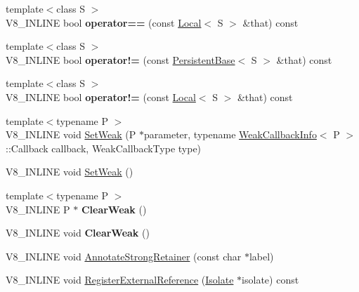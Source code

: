 \begin{DoxyCompactItemize}
{\footnotesize template$<$class S $>$ }\\V8\+\_\+\+I\+N\+L\+I\+NE bool {\bfseries operator==} (const \mbox{\hyperlink{classv8_1_1Local}{Local}}$<$ S $>$ \&that) const
\item 
\mbox{\label{classv8_1_1PersistentBase_a2893d38e56559c016e33e832b814a515}} 
{\footnotesize template$<$class S $>$ }\\V8\+\_\+\+I\+N\+L\+I\+NE bool {\bfseries operator!=} (const \mbox{\hyperlink{classv8_1_1PersistentBase}{Persistent\+Base}}$<$ S $>$ \&that) const
\item 
\mbox{\label{classv8_1_1PersistentBase_a6bfcb31182bcc9a2cc20b83807f7fb45}} 
{\footnotesize template$<$class S $>$ }\\V8\+\_\+\+I\+N\+L\+I\+NE bool {\bfseries operator!=} (const \mbox{\hyperlink{classv8_1_1Local}{Local}}$<$ S $>$ \&that) const
\item 
{\footnotesize template$<$typename P $>$ }\\V8\+\_\+\+I\+N\+L\+I\+NE void \mbox{\hyperlink{classv8_1_1PersistentBase_aebb8a2c97e219102f613ff3749c956f6}{Set\+Weak}} (P $\ast$parameter, typename \mbox{\hyperlink{classv8_1_1WeakCallbackInfo}{Weak\+Callback\+Info}}$<$ P $>$\+::Callback callback, Weak\+Callback\+Type type)
\item 
V8\+\_\+\+I\+N\+L\+I\+NE void \mbox{\hyperlink{classv8_1_1PersistentBase_a09fd1d1c3cd3ff32b91937f4d8beb1ea}{Set\+Weak}} ()
\item 
\mbox{\label{classv8_1_1PersistentBase_a444d27c00650e3663348024df08cb121}} 
{\footnotesize template$<$typename P $>$ }\\V8\+\_\+\+I\+N\+L\+I\+NE P $\ast$ {\bfseries Clear\+Weak} ()
\item 
\mbox{\label{classv8_1_1PersistentBase_afe515daead108cceb1699b54051df13b}} 
V8\+\_\+\+I\+N\+L\+I\+NE void {\bfseries Clear\+Weak} ()
\item 
V8\+\_\+\+I\+N\+L\+I\+NE void \mbox{\hyperlink{classv8_1_1PersistentBase_a27ddb6118b13225207e9641c1e6c8c91}{Annotate\+Strong\+Retainer}} (const char $\ast$label)
\item 
V8\+\_\+\+I\+N\+L\+I\+NE void \mbox{\hyperlink{classv8_1_1PersistentBase_a427ad28478a6a208605fca3d39ce4bdf}{Register\+External\+Reference}} (\mbox{\hyperlink{classv8_1_1Isolate}{Isolate}} $\ast$isolate) const

\end{DoxyCompactItemize}

